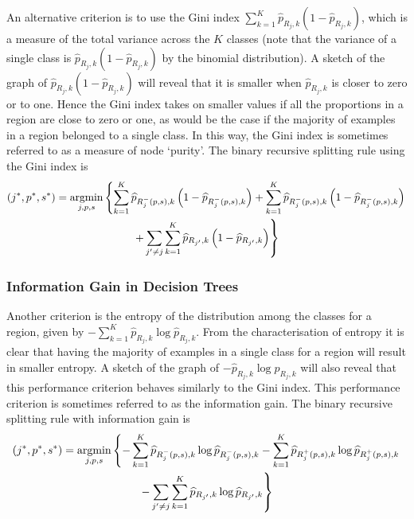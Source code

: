 \documentclass[11pt]{report} %
\begin{document}
An alternative criterion is to use the Gini index $\sum_{k = 1}^{K}\widehat{p}_{R_{j}, k}\left(1 - \widehat{p}_{R_{j}, k}\right)$, which is a measure of the total variance across the $K$ classes (note that the variance of a single class is $\widehat{p}_{R_{j}, k}\left(1 - \widehat{p}_{R_{j}, k}\right)$ by the binomial distribution). A sketch of the graph of $\widehat{p}_{R_{j}, k}\left(1 - \widehat{p}_{R_{j}, k}\right)$ will reveal that it is smaller when $\widehat{p}_{R_{j}, k}$ is closer to zero or to one. Hence the Gini index takes on smaller values if all the proportions in a region are close to zero or one, as would be the case if the majority of examples in a region belonged to a single class. In this way, the Gini index is sometimes referred to as a measure of node `purity'. The binary recursive splitting rule using the Gini index is
\begin{multline}
\left(j^{*}, p^{*}, s^{*}\right) = \operatorname*{argmin}_{j, p, s}\left\{\sum_{k = 1}^{K}\widehat{p}_{R_{j}^{-}\left(p, s\right), k}\left(1 - \widehat{p}_{R_{j}^{-}\left(p, s\right), k}\right) + \sum_{k = 1}^{K}\widehat{p}_{R_{j}^{-}\left(p, s\right), k}\left(1 - \widehat{p}_{R_{j}^{-}\left(p, s\right), k}\right) \right. \\
\left. + \sum_{j' \neq j}\sum_{k = 1}^{K}\widehat{p}_{R_{j'}, k}\left(1 - \widehat{p}_{R_{j'}, k}\right)\right\}
\end{multline}

\subsubsection{Information Gain in Decision Trees}

Another criterion is the entropy of the distribution among the classes for a region, given by $-\sum_{k = 1}^{K}\widehat{p}_{R_{j}, k}\log\widehat{p}_{R_{j}, k}$. From the characterisation of entropy it is clear that having the majority of examples in a single class for a region will result in smaller entropy. A sketch of the graph of $-\widehat{p}_{R_{j}, k}\log\widehat{p}_{R_{j}, k}$ will also reveal that this performance criterion behaves similarly to the Gini index. This performance criterion is sometimes referred to as the information gain. The binary recursive splitting rule with information gain is
\begin{multline}
\left(j^{*}, p^{*}, s^{*}\right) = \operatorname*{argmin}_{j, p, s}\left\{-\sum_{k = 1}^{K}\widehat{p}_{R_{j}^{-}\left(p, s\right), k}\log\widehat{p}_{R_{j}^{-}\left(p, s\right), k} - \sum_{k = 1}^{K}\widehat{p}_{R_{j}^{+}\left(p, s\right), k}\log\widehat{p}_{R_{j}^{+}\left(p, s\right), k} \right. \\
\left. - \sum_{j' \neq j}\sum_{k = 1}^{K}\widehat{p}_{R_{j'}, k}\log\widehat{p}_{R_{j'}, k}\right\}
\end{multline}
\end{document}
